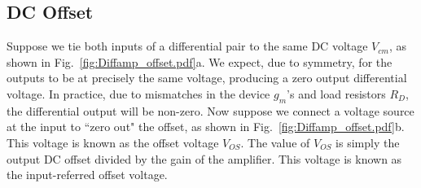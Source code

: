 \subsection{DC Offset}
Suppose we tie both inputs of a differential pair to the same DC voltage $V_{cm}$, as shown in Fig.~\ref{fig:Diffamp_offset.pdf}a.  We expect, due to symmetry, for the outputs to be at precisely the same voltage, producing a zero output differential voltage.  In practice, due to mismatches in the device $g_m$'s and load resistors $R_D$, the differential output will be non-zero.  Now suppose we connect a voltage source at the input to ``zero out" the offset, as shown in Fig.~\ref{fig:Diffamp_offset.pdf}b.  This voltage is known as the offset voltage $V_{OS}$.  The value of $V_{OS}$ is simply the output DC offset divided by the gain of the amplifier.  This voltage is known as the input-referred offset voltage.
